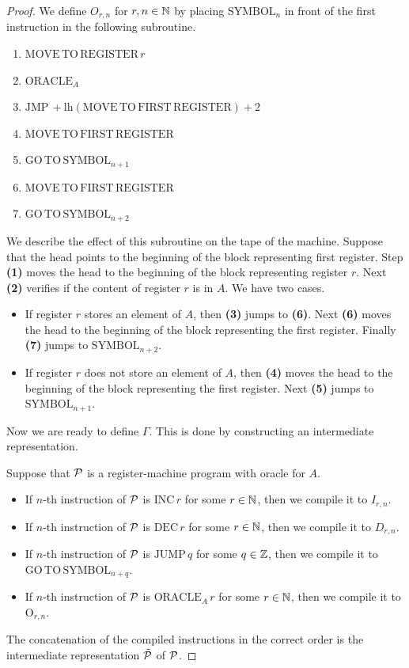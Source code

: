 \documentclass[10pt]{amsart}
\begin{document}
\begin{proof}
	We define $O_{r,n}$ for $r,n\in {\mathbb N}$ by placing $\mathrm{SYMBOL}_n$ in front of the first instruction in the following subroutine.
	\begin{enumerate}[label=\textbf{(\arabic*)}, leftmargin=3.0em]
		\item $\mathrm{MOVE\,TO\,REGISTER\,}r$
		\item $\mathrm{ORACLE}_A$
		\item $\mathrm{JMP\,}+\mathrm{lh}\left(\mathrm{MOVE\,TO\,FIRST\,REGISTER}\right) + 2$
		\item $\mathrm{MOVE\,TO\,FIRST\,REGISTER}$
		\item $\mathrm{GO\,TO\,}\mathrm{SYMBOL}_{n+1}$
		\item $\mathrm{MOVE\,TO\,FIRST\,REGISTER}$
		\item $\mathrm{GO\,TO\,}\mathrm{SYMBOL}_{n+2}$
	\end{enumerate}
	We describe the effect of this subroutine on the tape of the machine. Suppose that the head points to the beginning of the block representing first register. Step \textbf{(1)} moves the head to the beginning of the block representing register $r$. Next \textbf{(2)} verifies if the content of register $r$ is in $A$. We have two cases.
	\begin{itemize}
		\item If register $r$ stores an element of $A$, then \textbf{(3)} jumps to \textbf{(6)}. Next \textbf{(6)} moves the head to the beginning of the block representing the first register. Finally \textbf{(7)} jumps to $\mathrm{SYMBOL}_{n+2}$.
		\item If register $r$ does not store an element of $A$, then \textbf{(4)} moves the head to the beginning of the block representing the first register. Next \textbf{(5)} jumps to $\mathrm{SYMBOL}_{n+1}$.
	\end{itemize}

	Now we are ready to define $\Gamma$. This is done by constructing an intermediate representation.

	Suppose that ${\mathcal P}$ is a register-machine program with oracle for $A$.
	\begin{itemize}
		\item If $n$-th instruction of ${\mathcal P}$ is $\mathrm{INC\,}r$ for some $r\in {\mathbb N}$, then we compile it to $I_{r,n}$.
		\item If $n$-th instruction of ${\mathcal P}$ is $\mathrm{DEC\,}r$ for some $r\in {\mathbb N}$, then we compile it to $D_{r,n}$.
		\item If $n$-th instruction of ${\mathcal P}$ is $\mathrm{JUMP\,}q$ for some $q\in {\mathbb Z}$, then we compile it to $\mathrm{GO\,TO\,}\mathrm{SYMBOL}_{n+q}$.
		\item If $n$-th instruction of ${\mathcal P}$ is $\mathrm{ORACLE}_A\,r$ for some $r \in {\mathbb N}$, then we compile it to $\mathrm{O}_{r,n}$.
	\end{itemize}
	The concatenation of the compiled instructions in the correct order is the intermediate representation $\tilde{{\mathcal P}}$ of ${\mathcal P}$.


\end{proof}
\end{document}
